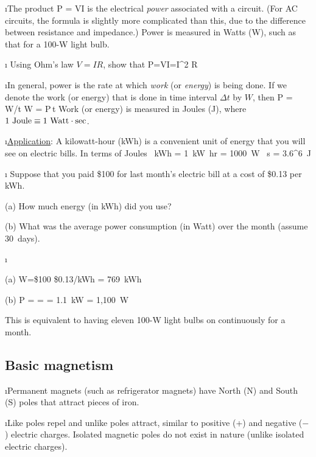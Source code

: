 \i The product 
%
\be
P = VI
\ee
%
is the electrical {\em power} associated with a circuit.
(For AC circuits, the formula is slightly more complicated than this,
due to the difference between resistance and impedance.)
Power is measured in Watts (W), such as that for a 100-W light bulb.

\i \exer
Using Ohm's law $V=IR$, show that
%
\be
P=VI=I^2 R 
\ee

\i In general, power is the rate at which {\em work} (or {\em energy})
is  being done. 
If we denote the work (or energy) that is done in 
time interval $\Delta t$ by $W$, then
%
\be
P = W/\Delta t
\quad
W = P\,\Delta t
\ee
%
Work (or energy) is measured in Joules (J), where 
$1~{\rm Joule} \equiv 1~{\rm Watt}\cdot{\rm sec}$.

\i \underline{Application}: 
A kilowatt-hour (kWh) is a convenient unit of 
energy that you will see on electric bills.
In terms of Joules
%
~{\rm kWh}
= 1~{\rm kW}~{\rm hr}
= 1000~{\rm W} ~{\rm s}
= 3.6^6~{\rm J}
\ee

\i \exer 
Suppose that you paid \$100 for last month's electric bill
at a cost of \$0.13 per kWh.

(a) How much energy (in kWh) did you use? 

(b) What was the average power consumption (in Watt) over 
the month (assume 30~days).

\i \ans

(a) 
\be 
W=\$100 \div \$0.13/{\rm kWh} = 769~{\rm kWh}
\ee 

(b)
\be
P =  
=  
= 1.1~{\rm kW} 
= 1,100~{\rm W}
\ee

This is equivalent to having eleven 100-W light bulbs 
on continuously for a month.
 
\ei

%
\subsection{Basic magnetism}

\bi

\i Permanent magnets (such as refrigerator magnets) have 
North (N) and South (S) poles that attract pieces of iron.

\i Like poles repel and unlike poles attract,
similar to positive (+) and negative ($-$) electric charges.
Isolated magnetic poles do not exist in nature (unlike isolated
electric charges).

